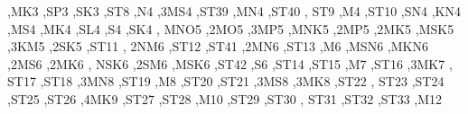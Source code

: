 \textquotesingle{},\textquotesingle{}\+M\+K3 \textquotesingle{},\textquotesingle{}\+S\+P3 \textquotesingle{},\textquotesingle{}\+S\+K3 \textquotesingle{},\textquotesingle{}\+S\+T8 \textquotesingle{},\textquotesingle{}\+N4 \textquotesingle{},\textquotesingle{}3\+M\+S4 \textquotesingle{},\textquotesingle{}\+S\+T39 \textquotesingle{},\textquotesingle{}\+M\+N4 \textquotesingle{},\textquotesingle{}\+S\+T40 \textquotesingle{}, \textquotesingle{}\+S\+T9 \textquotesingle{},\textquotesingle{}\+M4 \textquotesingle{},\textquotesingle{}\+S\+T10 \textquotesingle{},\textquotesingle{}\+S\+N4 \textquotesingle{},\textquotesingle{}\+K\+N4 \textquotesingle{},\textquotesingle{}\+M\+S4 \textquotesingle{},\textquotesingle{}\+M\+K4 \textquotesingle{},\textquotesingle{}\+S\+L4 \textquotesingle{},\textquotesingle{}\+S4 \textquotesingle{},\textquotesingle{}\+S\+K4 \textquotesingle{}, \textquotesingle{}\+M\+N\+O5 \textquotesingle{},\textquotesingle{}2\+M\+O5 \textquotesingle{},\textquotesingle{}3\+M\+P5 \textquotesingle{},\textquotesingle{}\+M\+N\+K5 \textquotesingle{},\textquotesingle{}2\+M\+P5 \textquotesingle{},\textquotesingle{}2\+M\+K5 \textquotesingle{},\textquotesingle{}\+M\+S\+K5 \textquotesingle{},\textquotesingle{}3\+K\+M5 \textquotesingle{},\textquotesingle{}2\+S\+K5 \textquotesingle{},\textquotesingle{}\+S\+T11 \textquotesingle{}, \textquotesingle{}2\+N\+M6 \textquotesingle{},\textquotesingle{}\+S\+T12 \textquotesingle{},\textquotesingle{}\+S\+T41 \textquotesingle{},\textquotesingle{}2\+M\+N6 \textquotesingle{},\textquotesingle{}\+S\+T13 \textquotesingle{},\textquotesingle{}\+M6 \textquotesingle{},\textquotesingle{}\+M\+S\+N6 \textquotesingle{},\textquotesingle{}\+M\+K\+N6 \textquotesingle{},\textquotesingle{}2\+M\+S6 \textquotesingle{},\textquotesingle{}2\+M\+K6 \textquotesingle{}, \textquotesingle{}\+N\+S\+K6 \textquotesingle{},\textquotesingle{}2\+S\+M6 \textquotesingle{},\textquotesingle{}\+M\+S\+K6 \textquotesingle{},\textquotesingle{}\+S\+T42 \textquotesingle{},\textquotesingle{}\+S6 \textquotesingle{},\textquotesingle{}\+S\+T14 \textquotesingle{},\textquotesingle{}\+S\+T15 \textquotesingle{},\textquotesingle{}\+M7 \textquotesingle{},\textquotesingle{}\+S\+T16 \textquotesingle{},\textquotesingle{}3\+M\+K7 \textquotesingle{}, \textquotesingle{}\+S\+T17 \textquotesingle{},\textquotesingle{}\+S\+T18 \textquotesingle{},\textquotesingle{}3\+M\+N8 \textquotesingle{},\textquotesingle{}\+S\+T19 \textquotesingle{},\textquotesingle{}\+M8 \textquotesingle{},\textquotesingle{}\+S\+T20 \textquotesingle{},\textquotesingle{}\+S\+T21 \textquotesingle{},\textquotesingle{}3\+M\+S8 \textquotesingle{},\textquotesingle{}3\+M\+K8 \textquotesingle{},\textquotesingle{}\+S\+T22 \textquotesingle{}, \textquotesingle{}\+S\+T23 \textquotesingle{},\textquotesingle{}\+S\+T24 \textquotesingle{},\textquotesingle{}\+S\+T25 \textquotesingle{},\textquotesingle{}\+S\+T26 \textquotesingle{},\textquotesingle{}4\+M\+K9 \textquotesingle{},\textquotesingle{}\+S\+T27 \textquotesingle{},\textquotesingle{}\+S\+T28 \textquotesingle{},\textquotesingle{}\+M10 \textquotesingle{},\textquotesingle{}\+S\+T29 \textquotesingle{},\textquotesingle{}\+S\+T30 \textquotesingle{}, \textquotesingle{}\+S\+T31 \textquotesingle{},\textquotesingle{}\+S\+T32 \textquotesingle{},\textquotesingle{}\+S\+T33 \textquotesingle{},\textquotesingle{}\+M12 